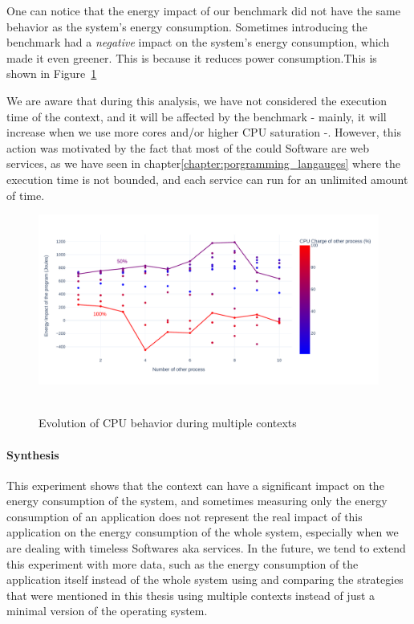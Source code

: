One can notice that the energy impact of our benchmark did not have the same behavior as the system's energy consumption. Sometimes introducing the benchmark had a \emph{negative} impact on the system's energy consumption, which made it even greener. This is because it reduces power consumption.This is shown in Figure~\ref{fig:green_faas_impact}

We are aware that during this analysis, we have not considered the execution time of the context, and it will be affected by the benchmark - mainly, it will increase when we use more cores and/or higher CPU saturation -. However, this action was motivated by the fact that most of the could Software are web services, as we have seen in chapter\ref{chapter:porgramming_langauges} where the execution time is not bounded, and each service can run for an unlimited amount of time.
\begin{figure}[!t]
      \centering
      \caption{Evolution of CPU behavior during multiple contexts }
      \includegraphics[width=\linewidth]{chapters/green_faas_impact}\
      \label{fig:green_faas_impact}
\end{figure}
\paragraph*{Synthesis}
This experiment shows that the context can have a significant impact on the energy consumption of the system, and sometimes measuring only the energy consumption of an application does not represent the real impact of this application on the energy consumption of the whole system, especially when we are dealing with timeless Softwares aka services. 
In the future, we tend to extend this experiment with more data, such as the energy consumption of the application itself instead of the whole system using \cite{fieni2020smartwatts} and comparing the strategies that were mentioned in this thesis using multiple contexts instead of just a minimal version of the operating system.





